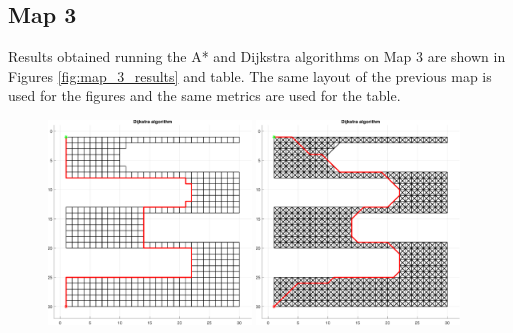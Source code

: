 \subsection{Map 3}
\label{subsec:map_3}

Results obtained running the A* and Dijkstra algorithms on Map 3 are shown in Figures \ref{fig:map_3_results} and table.
The same layout of the previous map is used for the figures and the same metrics are used for the table.

\begin{figure}[H]
    \centering
    \includegraphics[width=0.48\textwidth]{./img/MATLAB/03_dijkstra_orthogonal.pdf}
    \hspace{6pt}
    \includegraphics[width=0.48\textwidth]{./img/MATLAB/03_dijkstra_diagonal.pdf}

    \vspace{11pt}


\end{figure}
